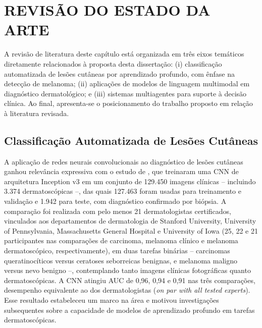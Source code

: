\chapter[REVISÃO DO ESTADO DA ARTE]{REVISÃO DO ESTADO DA ARTE}

A revisão de literatura deste capítulo está organizada em três eixos temáticos diretamente relacionados à proposta desta dissertação: (i) classificação automatizada de lesões cutâneas por aprendizado profundo, com ênfase na detecção de melanoma; (ii) aplicações de modelos de linguagem multimodal em diagnóstico dermatológico; e (iii) sistemas multiagentes para suporte à decisão clínica. Ao final, apresenta-se o posicionamento do trabalho proposto em relação à literatura revisada.


\section{Classificação Automatizada de Lesões Cutâneas}

A aplicação de redes neurais convolucionais ao diagnóstico de lesões cutâneas ganhou relevância expressiva com o estudo de , que treinaram uma CNN de arquitetura Inception v3 em um conjunto de 129.450 imagens clínicas -- incluindo 3.374 dermatoscópicas --, das quais 127.463 foram usadas para treinamento e validação e 1.942 para teste, com diagnóstico confirmado por biópsia. A comparação foi realizada com pelo menos 21 dermatologistas certificados, vinculados aos departamentos de dermatologia de Stanford University, University of Pennsylvania, Massachusetts General Hospital e University of Iowa (25, 22 e 21 participantes nas comparações de carcinoma, melanoma clínico e melanoma dermatoscópico, respectivamente), em duas tarefas binárias -- carcinomas queratinocíticos versus ceratoses seborreicas benignas, e melanoma maligno versus nevo benigno --, contemplando tanto imagens clínicas fotográficas quanto dermatoscópicas. A CNN atingiu AUC de 0,96, 0,94 e 0,91 nas três comparações, desempenho equivalente ao dos dermatologistas (\textit{on par with all tested experts}). Esse resultado estabeleceu um marco na área e motivou investigações subsequentes sobre a capacidade de modelos de aprendizado profundo em tarefas dermatoscópicas.

